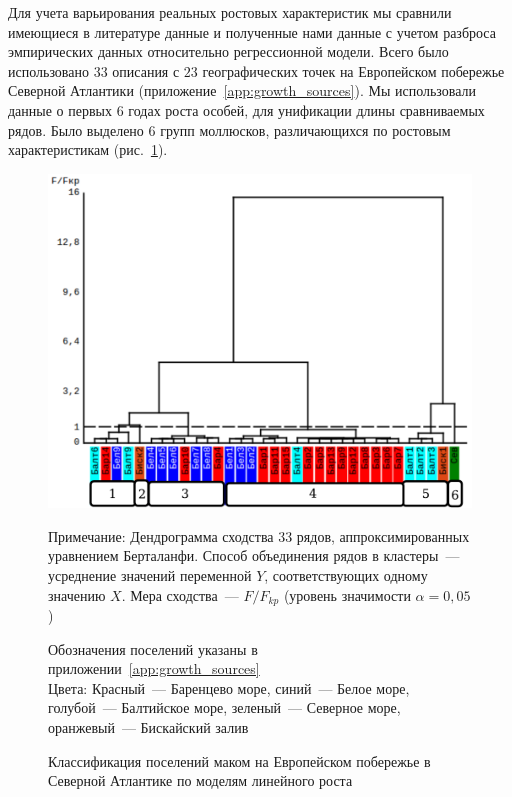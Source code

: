 Для учета варьирования реальных ростовых характеристик мы сравнили имеющиеся в литературе данные и полученные нами данные с учетом разброса эмпирических данных относительно регрессионной модели.
Всего было использовано $33$ описания с $23$ географических точек на Европейском побережье Северной Атлантики (приложение~\ref{app:growth_sources}).
Мы использовали данные о первых $6$ годах роста особей, для унификации длины сравниваемых рядов.
Было выделено $6$ групп моллюсков, различающихся по ростовым характеристикам (рис.~\ref{ris:growth_cluster_literature}).
	\begin{figure}[p]
	\begin{center}	
		\includegraphics[width=\textwidth]{../Growth_sravnenie/Europe_clusters_usrednenie.pdf}
	\end{center}
		\caption{Классификация поселений маком на Европейском побережье в Северной Атлантике по моделям линейного роста}


	\footnotesize{Примечание: Дендрограмма сходства 33 рядов, аппроксимированных уравнением Берталанфи. 
Способ объединения рядов в кластеры~--- усреднение значений переменной $Y$, соответствующих одному значению $X$.
Мера сходства~--- $F/F_{kp}$ (уровень значимости $\alpha = 0,05$)

Обозначения поселений указаны в приложении~\ref{app:growth_sources} \\
Цвета: Красный~--- Баренцево море, синий~--- Белое море, голубой~--- Балтийское море, зеленый~--- Северное море, оранжевый~--- Бискайский залив}
		\label{ris:growth_cluster_literature}
	\end{figure}

